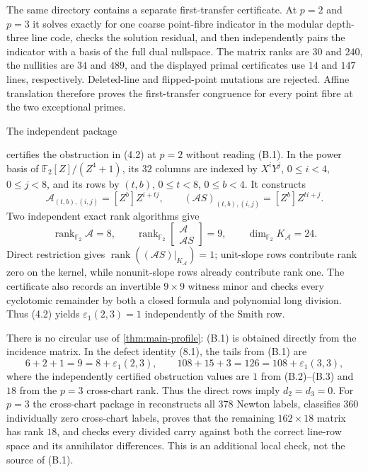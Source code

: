 \documentclass[12pt,a4paper]{article}
\theoremstyle{definition}
\newcommand{\F}{\mathbb F}
\newcommand{\rank}{\operatorname{rank}}
\newcommand{\eps}{\varepsilon}
\begin{document}
The same directory contains a separate first-transfer certificate.  At
$p=2$ and $p=3$ it solves exactly for one coarse point-fibre indicator in
the modular depth-three line code, checks the solution residual, and then
independently pairs the indicator with a basis of the full dual nullspace.
The matrix ranks are $30$ and $240$, the nullities are $34$ and $489$, and
the displayed primal certificates use $14$ and $147$ lines, respectively.
Deleted-line and flipped-point mutations are rejected.  Affine translation
therefore proves the first-transfer congruence for every point fibre at the
two exceptional primes.

The independent package
\begin{center}
\end{center}
certifies the obstruction in (4.2) at $p=2$ without reading (B.1).  In the
power basis of $\F_2[Z]/(Z^4+1)$, its $32$ columns are indexed by
$X^iY^j$, $0\leq i<4$, $0\leq j<8$, and its rows by
$(t,b)$, $0\leq t<8$, $0\leq b<4$.  It constructs
\[
 \mathcal A_{(t,b),(i,j)}=[Z^b]Z^{i+tj},\qquad
 (\mathcal AS)_{(t,b),(i,j)}=[Z^b]Z^{ti+j}.
\tag{B.2}
\]
Two independent exact rank algorithms give
\[
 \rank_{\F_2}\mathcal A=8,\qquad
 \rank_{\F_2}\begin{bmatrix}\mathcal A\\ \mathcal AS\end{bmatrix}=9,
 \qquad \dim_{\F_2}K_{\mathcal A}=24.
\tag{B.3}
\]
Direct restriction gives
$\rank((\mathcal AS)|_{K_{\mathcal A}})=1$; unit-slope rows contribute
rank zero on the kernel, while nonunit-slope rows already contribute rank
one.  The certificate also records an invertible $9\times9$ witness minor
and checks every cyclotomic remainder by both a closed formula and polynomial
long division.  Thus (4.2) yields $\eps_1(2,3)=1$ independently of the Smith
row.

There is no circular use of \cref{thm:main-profile}: (B.1) is obtained
directly from the incidence matrix.  In the defect identity (8.1), the tails
from (B.1) are
\[
 6+2+1=9=8+\eps_1(2,3),\qquad
 108+15+3=126=108+\eps_1(3,3),
\]
where the independently certified obstruction values are $1$ from
(B.2)--(B.3) and $18$ from the $p=3$ cross-chart rank.
Thus the direct rows imply $d_2=d_3=0$.  For $p=3$ the cross-chart package
in  reconstructs all $378$ Newton labels,
classifies $360$ individually zero cross-chart labels, proves that the
remaining $162\times18$ matrix has rank $18$, and checks every divided
carry against both the correct line-row space and its annihilator
differences.  This is an additional local check, not the source of (B.1).
\end{document}
